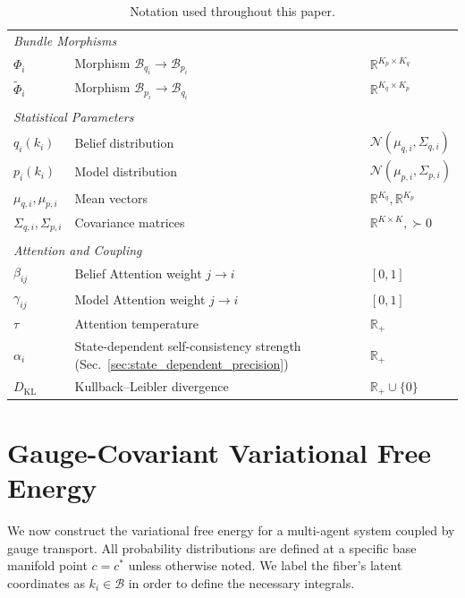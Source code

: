 \documentclass[twoside,11pt]{article}
\begin{document}
\begin{table}[h]
\begin{tabularx}{\textwidth}{l>{\raggedright\arraybackslash}Xl}
\\
\multicolumn{3}{l}{\textit{Bundle Morphisms}} \\
$\Phi_i$ & Morphism $\mathcal{B}_{q_i} \to \mathcal{B}_{p_i}$ & $\mathbb{R}^{K_p\times K_q}$ \\
$\tilde{\Phi}_i$ & Morphism $\mathcal{B}_{p_i} \to \mathcal{B}_{q_i}$ & $\mathbb{R}^{K_q\times K_p}$ \\
\\
\multicolumn{3}{l}{\textit{Statistical Parameters}} \\
$q_i(k_i)$ & Belief distribution & $\mathcal{N}(\mu_{q,i},\Sigma_{q,i})$ \\
$p_i(k_i)$ & Model distribution & $\mathcal{N}(\mu_{p,i},\Sigma_{p,i})$ \\
$\mu_{q,i},\mu_{p,i}$ & Mean vectors & $\mathbb{R}^{K_q},\mathbb{R}^{K_p}$ \\
$\Sigma_{q,i},\Sigma_{p,i}$ & Covariance matrices & $\mathbb{R}^{K\times K},\succ0$ \\
\\
\multicolumn{3}{l}{\textit{Attention and Coupling}} \\
$\beta_{ij}$ & Belief Attention weight $j\!\to\!i$ & $[0,1]$ \\
$\gamma_{ij}$ & Model Attention weight $j\!\to\!i$ & $[0,1]$ \\
$\tau$ & Attention temperature & $\mathbb{R}_+$ \\
$\alpha_i$ & State-dependent self-consistency strength (Sec.~\ref{sec:state_dependent_precision}) & $\mathbb{R}_+$ \\
$D_{\mathrm{KL}}$ & Kullback–Leibler divergence & $\mathbb{R}_+\cup\{0\}$ \\
\hline
\end{tabularx}
\caption{Notation used throughout this paper.}
\label{tab:notation}
\end{table}



\section{Gauge-Covariant Variational Free Energy}
\label{sec:free_energy_section}

We now construct the variational free energy for a multi-agent system coupled by gauge transport. All probability distributions are defined at a specific base manifold point $c = c^*$ unless otherwise noted. We label the fiber's latent coordinates as $k_i \in \mathcal{B}$ in order to define the necessary integrals.
\end{document}
